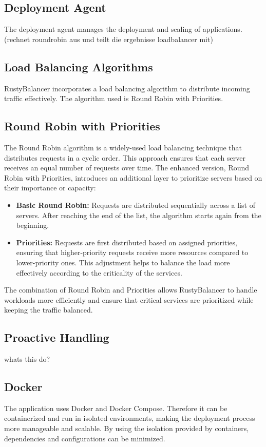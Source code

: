 \documentclass[twocolumn]{el-author}
\begin{document}
\subsection{Deployment Agent}
The deployment agent manages the deployment and scaling of applications.
(rechnet roundrobin aus und teilt die ergebnisse loadbalancer mit)

\subsection{Load Balancing Algorithms}
RustyBalancer incorporates a load balancing algorithm to distribute incoming traffic effectively.
The algorithm used is Round Robin with Priorities.

\subsection{Round Robin with Priorities}
The Round Robin algorithm is a widely-used load balancing technique that distributes requests in a cyclic order.
This approach ensures that each server receives an equal number of requests over time.
The enhanced version, Round Robin with Priorities, introduces an additional layer to prioritize servers based on their importance or capacity:

\begin{itemize}
    \item \textbf{Basic Round Robin:} Requests are distributed sequentially across a list of servers. After reaching the end of the list, the algorithm starts again from the beginning.
    \item \textbf{Priorities:} Requests are first distributed based on assigned priorities, ensuring that higher-priority requests receive more resources compared to lower-priority ones. This adjustment helps to balance the load more effectively according to the criticality of the services.
\end{itemize}

The combination of Round Robin and Priorities allows RustyBalancer to handle workloads more efficiently and ensure that critical services are prioritized while keeping the traffic balanced.

\subsection{Proactive Handling}
whats this do?

\subsection{Docker}
The application uses Docker and Docker Compose.
Therefore it can be containerized and run in isolated environments, making the deployment process more manageable and scalable.
By using the isolation provided by containers, dependencies and configurations can be minimized.
\end{document}
